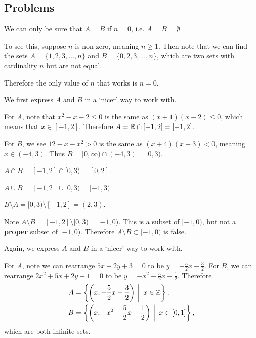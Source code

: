 \subsection*{Problems}
\begin{questions}
    \item We can only be sure that $A = B$ if $n = 0$, i.e. $A = B = \emptyset$.

    To see this, suppose $n$ is non-zero, meaning $n \geq 1$. Then note that we can find the sets $A = \{1, 2, 3, \dots, n\}$ and $B = \{0, 2, 3, \dots, n\}$, which are two sets with cardinality $n$ but are not equal.

    Therefore the only value of $n$ that works is $n = 0$.

    \item We first express $A$ and $B$ in a `nicer' way to work with.

    For $A$, note that $x^2 - x - 2 \leq 0$ is the same as $(x+1)(x-2) \leq 0$, which means that $x \in [-1, 2]$. Therefore $A = \mathbb{R} \cap [-1, 2] = [-1, 2]$.

    For $B$, we see $12 - x - x^2 > 0$ is the same as $(x+4)(x-3) < 0$, meaning $x \in (-4, 3)$. Thus $B = [0, \infty) \cap (-4, 3) = [0, 3)$.

    \begin{partquestions}{\alph*}
        \item $A \cap B = [-1, 2] \cap [0, 3) = [0, 2]$.
        \item $A \cup B = [-1, 2] \cup [0, 3) = [-1, 3)$.
        \item $B \setminus A = [0, 3) \setminus [-1, 2] = (2, 3)$.
        \item Note $A \setminus B = [-1, 2] \setminus [0, 3) = [-1, 0)$. This is a subset of $[-1, 0)$, but not a \textbf{proper} subset of $[-1, 0)$. Therefore $A\setminus B \subset [-1, 0)$ is false.
    \end{partquestions}

    \item Again, we express $A$ and $B$ in a `nicer' way to work with.

    For $A$, note we can rearrange $5x+2y+3=0$ to be $y=-\frac52x-\frac32$. For $B$, we can rearrange $2x^2+5x+2y+1=0$ to be $y=-x^2-\frac52x-\frac12$. Therefore
    \begin{align*}
        A &= \left\{\left(x, -\frac52x-\frac32\right) \vert x \in \Z \right\},\\
        B &= \left\{\left(x, -x^2-\frac52x-\frac12\right) \vert x \in [0, 1] \right\},
    \end{align*}
    which are both infinite sets.


\end{questions}
